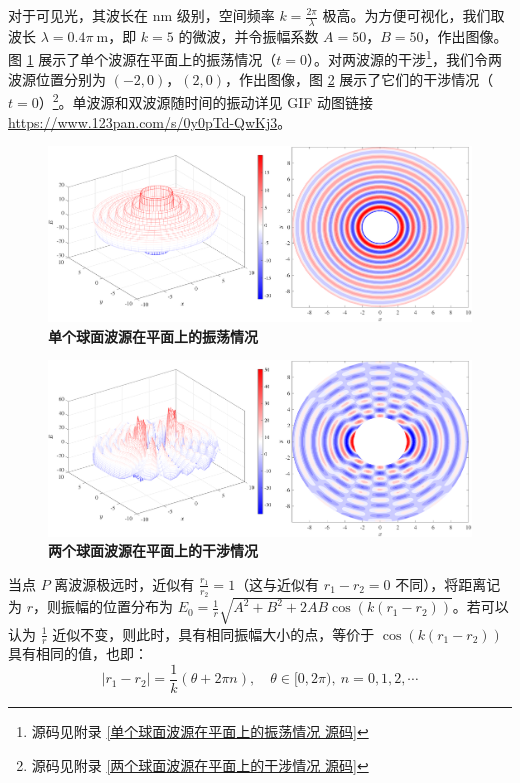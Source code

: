 \documentclass[UTF8]{report}
\theoremstyle{MyLineTheoremStyle} %
\theoremstyle{MyBlockTheoremStyle} %
\theoremstyle{MySubsubsectionStyle} %
\begin{document}
对于可见光，其波长在 nm 级别，空间频率 $k = \frac{2\pi}{\lambda}$ 极高。为方便可视化，我们取波长 $\lambda = 0.4 \pi \ \mathrm{m}$，即 $k = 5$ 的微波，并令振幅系数 $A = 50$，$B = 50$，作出图像。图 \ref{单个球面波源在平面上的振荡情况} 展示了单个波源在平面上的振荡情况（$t = 0$）。对两波源的干涉\footnote{源码见附录 \ref{单个球面波源在平面上的振荡情况 源码}}，我们令两波源位置分别为 $(-2, 0)$，$(2, 0)$，作出图像，图 \ref{两个球面波源在平面上的干涉情况} 展示了它们的干涉情况（$t = 0$）\footnote{源码见附录 \ref{两个球面波源在平面上的干涉情况 源码}}。单波源和双波源随时间的振动详见 GIF 动图链接 \href{https://www.123pan.com/s/0y0pTd-QwKj3}{https://www.123pan.com/s/0y0pTd-QwKj3}。

\begin{figure}[H]\centering
\includegraphics[width=0.95\columnwidth]{assets/3/单个球面波源.pdf}
\caption{\bfseries 单个球面波源在平面上的振荡情况}\label{单个球面波源在平面上的振荡情况}
\end{figure}

\begin{figure}[H]\centering
\includegraphics[width=0.95\columnwidth]{assets/3/两个球面波源.pdf}
\caption{\bfseries 两个球面波源在平面上的干涉情况}\label{两个球面波源在平面上的干涉情况}
\end{figure}

当点 $P$ 离波源极远时，近似有 $\frac{r_1}{r_2} = 1$（这与近似有 $r_1 - r_2 = 0$ 不同），将距离记为 $r$，则振幅的位置分布为 $E_0 = \frac{1}{r} \sqrt{ A^2 + B^2 + 2AB \cos (k(r_1 - r_2))} $。若可以认为 $\frac{1}{r}$ 近似不变，则此时，具有相同振幅大小的点，等价于 $\cos (k(r_1 - r_2))$ 具有相同的值，也即：
\begin{equation}
    | r_1 -  r_2| =  \frac{1}{k} (\theta + 2\pi n),\quad \theta \in [0, 2\pi),\  n = 0,1,2,\cdots
\end{equation}
\end{document}
